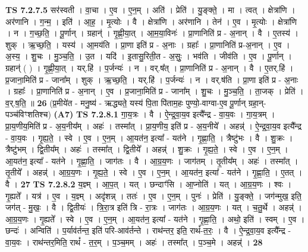 \documentclass[17pt]{extarticle}
\begin{document}
                  \newline
                                \textbf{ TS 7.2.7.5} \newline
                  सर॑स्वती । वा॒चा । ए॒व । ए॒न॒म् । अति॑ । प्रेति॑ । यु॒ङ्क्ते॒ । मा । त्वत् । क्षेत्रा॑णि । अर॑णानि । ग॒न्म॒ । इति॑ । आ॒ह॒ । मृ॒त्योः । वै । क्षेत्रा॑णि । अर॑णानि । तेन॑ । ए॒व । मृ॒त्योः । क्षेत्रा॑णि । न । ग॒च्छ॒ति॒ । पू॒र्णान् । ग्रहान्॑ । गृ॒ह्णी॒या॒त् । आ॒म॒या॒विनः॑ । प्रा॒णानिति॑ प्र - अ॒नान् । वै । ए॒तस्य॑ । शुक् । ऋ॒च्छ॒ति॒ । यस्य॑ । आ॒मय॑ति । प्रा॒णा इति॑ प्र - अ॒नाः । ग्रहाः᳚ । प्रा॒णानिति॑ प्र-अ॒नान् । ए॒व । अ॒स्य॒ । शु॒चः । मु॒ञ्च॒ति॒ । उ॒त । यदि॑ । इ॒तासु॒रिती॒त - अ॒सुः॒ । भव॑ति । जीव॑ति । ए॒व । पू॒र्णान् । ग्रहान्॑ ( ) । गृ॒ह्णी॒या॒त् । यर्.हि॑ । प॒र्जन्यः॑ । न । वर्.ष᳚त् । प्रा॒णानिति॑ प्र - अ॒नान् । वै । ए॒तर्.हि॑ । प्र॒जाना॒मिति॑ प्र - जाना᳚म् । शुक् । ऋ॒च्छ॒ति॒ । यर्.हि॑ । प॒र्जन्यः॑ । न । वर्.ष॑ति । प्रा॒णा इति॑ प्र - अ॒नाः । ग्रहाः᳚ । प्रा॒णानिति॑ प्र - अ॒नान् । ए॒व । प्र॒जाना॒मिति॑ प्र - जाना᳚म् । शु॒चः । मु॒ञ्च॒ति॒ । ता॒जक् । प्रेति॑ । व॒र्.ष॒ति॒ ॥ \textbf{  26} \newline
                  \newline
                      (प्र॒मीये॑त - मनु॒ष्य॑ - ऋद्ध्यते॒ यस्य॑ पि॒ता पि॑ताम॒हः पुण्यो॒-वाग्वा-ए॒व पू॒र्णान् ग्रहा॒न्-पञ्च॑विꣳशतिश्च)  \textbf{(A7)} \newline \newline
                                \textbf{ TS 7.2.8.1} \newline
                  गा॒य॒त्रः । वै । ऐ॒न्द्र॒वा॒य॒व इत्यै᳚न्द्र - वा॒य॒वः । गा॒य॒त्रम् । प्रा॒य॒णीय॒मिति॑ प्र - अ॒य॒नीय᳚म् । अहः॑ । तस्मा᳚त् । प्रा॒य॒णीय॒ इति॑ प्र - अ॒य॒नीये᳚ । अहन्न्॑ । ऐ॒न्द्र॒वा॒य॒व इत्यै᳚न्द्र - वा॒य॒वः । गृ॒ह्य॒ते॒ । स्वे । ए॒व । ए॒न॒म् । आ॒यत॑न॒ इत्या᳚ - यत॑ने । गृ॒ह्णा॒ति॒ । त्रैष्टु॑भः । वै । शु॒क्रः । त्रैष्टु॑भम् । द्वि॒तीय᳚म् । अहः॑ । तस्मा᳚त् । द्वि॒तीये᳚ । अहन्न्॑ । शु॒क्रः । गृ॒ह्य॒ते॒ । स्वे । ए॒व । ए॒न॒म् । आ॒यत॑न॒ इत्या᳚ - यत॑ने । गृ॒ह्णा॒ति॒ । जाग॑तः । वै । आ॒ग्र॒य॒णः । जाग॑तम् । तृ॒तीय᳚म् । अहः॑ । तस्मा᳚त् । तृ॒तीये᳚ । अहन्न्॑ । आ॒ग्र॒य॒णः । गृ॒ह्य॒ते॒ । स्वे । ए॒व । ए॒न॒म् । आ॒यत॑न॒ इत्या᳚ - यत॑ने । गृ॒ह्णा॒ति॒ । ए॒तत् । वै । \textbf{  27} \newline
                  \newline
                                \textbf{ TS 7.2.8.2} \newline
                  य॒ज्ञ्म् । आ॒प॒त् । यत् । छन्दाꣳ॑सि । आ॒प्नोति॑ । यत् । आ॒ग्र॒य॒णः । श्वः । गृ॒ह्यते᳚ । यत्र॑ । ए॒व । य॒ज्ञ्म् । अदृ॑शन्न् । ततः॑ । ए॒व । ए॒न॒म् । पुनः॑ । प्रेति॑ । यु॒ङ्क्ते॒ । जग॑न्मुख॒ इति॒ जग॑त् - मु॒खः॒ । वै । द्वि॒तीयः॑ । त्रि॒रा॒त्र इति॑ त्रि - रा॒त्रः । जाग॑तः । आ॒ग्र॒य॒णः । यत् । च॒तु॒र्थे । अहन्न्॑ । आ॒ग्र॒य॒णः । गृ॒ह्यते᳚ । स्वे । ए॒व । ए॒न॒म् । आ॒यत॑न॒ इत्या᳚ - यत॑ने । गृ॒ह्णा॒ति॒ । अथो॒ इति॑ । स्वम् । ए॒व । छन्दः॑ । अन्विति॑ । प॒र्याव॑र्तन्त॒ इति॑ परि-आव॑र्तन्ते । राथ॑न्तर॒ इति॒ राथं᳚-त॒रः॒ । वै । ऐ॒न्द्र॒वा॒य॒व इत्यै᳚न्द्र - वा॒य॒वः । राथ॑न्तर॒मिति॒ राथं᳚ - त॒र॒म् । प॒ञ्च॒मम् । अहः॑ । तस्मा᳚त् । प॒ञ्च॒मे । अहन्न्॑ । \textbf{  28} \newline
\end{document}
